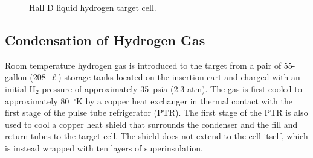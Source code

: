 
\begin{figure}[h]
\begin{center}
\end{center}
\caption{
Hall D liquid hydrogen target cell.
\label{fig:tgt:cell}}
\end{figure}

 
\subsection[Condensation of Hydrogen Gas]{Condensation of Hydrogen Gas 
\label{sec:tgt:condens}}

Room temperature hydrogen gas is introduced to the target from a pair
of 55-gallon (208~$\ell$) storage tanks located on the insertion cart
and charged with an initial H$_2$ pressure of approximately 35~psia (2.3
atm).  The gas is first cooled to approximately 80~$^\circ$K by a copper heat
exchanger in thermal contact with the first stage of the pulse tube
refrigerator (PTR).  The first stage of the PTR is also used to cool a
copper heat shield that surrounds the condenser and the fill and
return tubes to the target cell.  The shield does not extend to the
cell itself, which is instead wrapped with ten layers of
superinsulation.


